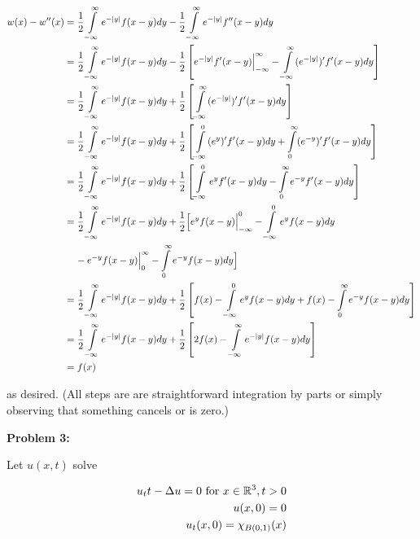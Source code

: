 \documentclass[a4paper,12pt]{article}
\begin{document}
\begin{align*}
w(x) - w''(x) &= \frac{1}{2} \int\limits_{-\infty}^\infty e^{-\left\lvert y \right\rvert} f(x-y) dy-\frac{1}{2} \int\limits_{-\infty}^\infty e^{-\left\lvert y \right\rvert} f''(x-y) dy\\
&= \frac{1}{2} \int\limits_{-\infty}^\infty e^{-\left\lvert y \right\rvert} f(x-y) dy-\frac{1}{2} \left[ e^{-\left\lvert y \right\rvert} f'(x-y) \Bigr|_{-\infty}^\infty - \int\limits_{-\infty}^\infty (e^{-\left\lvert y \right\rvert})' f'(x-y) dy \right]\\
&= \frac{1}{2} \int\limits_{-\infty}^\infty e^{-\left\lvert y \right\rvert} f(x-y) dy+\frac{1}{2} \left[\int\limits_{-\infty}^\infty (e^{-\left\lvert y \right\rvert})' f'(x-y) dy \right]\\
&= \frac{1}{2} \int\limits_{-\infty}^\infty e^{-\left\lvert y \right\rvert} f(x-y) dy+\frac{1}{2} \left[\int\limits_{-\infty}^0 (e^{y})' f'(x-y) dy + \int\limits_{0}^\infty (e^{-y})' f'(x-y) dy \right]\\
&= \frac{1}{2} \int\limits_{-\infty}^\infty e^{-\left\lvert y \right\rvert} f(x-y) dy+\frac{1}{2} \left[\int\limits_{-\infty}^0 e^{y} f'(x-y) dy - \int\limits_{0}^\infty e^{-y} f'(x-y) dy \right]\\
&= \frac{1}{2} \int\limits_{-\infty}^\infty e^{-\left\lvert y \right\rvert} f(x-y) dy+\frac{1}{2} \Big[e^yf(x-y)\Bigr|_{-\infty}^0 - \int\limits_{-\infty}^0 e^yf(x-y) dy \\
& \hspace{4mm} - e^{-y}f(x-y)\Bigr|_{0}^\infty - \int\limits_{0}^\infty e^{-y}f(x-y) dy \Big]\\
&= \frac{1}{2} \int\limits_{-\infty}^\infty e^{-\left\lvert y \right\rvert} f(x-y) dy+\frac{1}{2} \left[f(x) - \int\limits_{-\infty}^0 e^yf(x-y) dy +f(x) - \int\limits_{0}^\infty e^{-y}f(x-y) dy \right]\\
&= \frac{1}{2} \int\limits_{-\infty}^\infty e^{-\left\lvert y \right\rvert} f(x-y) dy+\frac{1}{2} \left[2f(x) - \int\limits_{-\infty}^\infty e^{-\left\lvert y \right\rvert}f(x-y) dy \right]\\
&= f(x)
\end{align*}

as desired. (All steps are are straightforward integration by parts or simply observing that something cancels or is zero.)

\shunt

{\bf Problem 3:}

Let $u(x,t)$ solve

\begin{align*}
u_tt - \Delta u = 0 \text{ for } x \in \mathbb{R}^3, t>0\\
u(x,0) = 0\\
u_t(x,0) = \chi_{B(0,1)}(x)\\
\end{align*}
\end{document}
